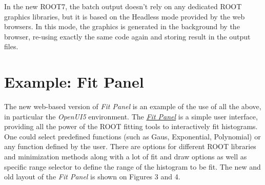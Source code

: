\documentclass[a4paper]{jpconf}
\begin{document}
In the new ROOT7, the batch output doesn't rely on any dedicated ROOT graphics
libraries, but it is based on the \textit{}{Headless mode} provided by the web
browsers. In this mode, the graphics is generated in the background by the browser, re-using exactly the same code again and storing result in the output files.

\section{Example: Fit Panel}

The new web-based version of \textit{Fit Panel} is an example of the use of all the above,
in particular the \textit{OpenUI5} environment.
The \href{https://root.cern/fit-panel}{\textit{Fit Panel}} is a simple user interface, providing all the
power of the ROOT fitting tools to interactively fit histograms. One could select predefined
functions (such as Gaus, Exponential, Polynomial) or any function defined by
the user. There are options for different ROOT libraries and minimization methods
along with a lot of fit and draw options as well as specific range selector to define the range of the
histogram to be fit. The new and old layout of the \textit{Fit Panel} is shown on Figures 3 and 4.
\end{document}
